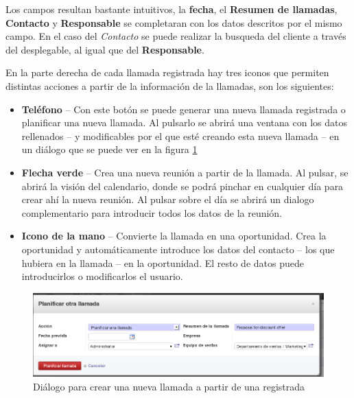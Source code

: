 Los campos resultan bastante intuitivos, la \textbf{fecha}, el \textbf{Resumen de llamadas}, \textbf{Contacto} y \textbf{Responsable} se 
completaran con los datos descritos por el mismo campo. En el caso del \emph{Contacto} se puede realizar la busqueda del cliente a través
del desplegable, al igual que del \textbf{Responsable}.

En la parte derecha de cada llamada registrada hay tres iconos que permiten distintas acciones a partir de la información de la llamadas, son los siguientes:

\begin{itemize}
  \item \textbf{Teléfono} -- Con este botón se puede generar una nueva llamada registrada o planificar una nueva llamada. Al pulsarlo se 
                           abrirá una ventana con los datos rellenados -- y modificables por el que esté creando esta nueva llamada -- en 
                           un diálogo que se puede ver en la figura \ref{ven:llacrear}
  \item \textbf{Flecha verde} -- Crea una nueva reunión a partir de la llamada. Al pulsar, se abrirá la visión del calendario, donde se 
                           podrá pinchar en cualquier día para crear ahí la nueva reunión. Al pulsar sobre el día se abrirá un dialogo 
                           complementario para introducir todos los datos de la reunión.
  \item \textbf{Icono de la mano} -- Convierte la llamada en una oportunidad. Crea la oportunidad y automáticamente introduce los datos
                           del contacto -- los que hubiera en la llamada -- en la oportunidad. El resto de datos puede introducirlos o
                           modificarlos el usuario.
\end{itemize}

\begin{figure}[H]
\includegraphics[width=\textwidth]{ventas/img/ven_llacrear.png}
\caption{Diálogo para crear una nueva llamada a partir de una registrada}
\label{ven:llacrear}
\end{figure}




